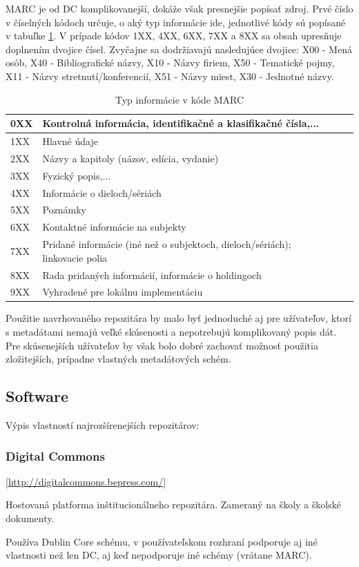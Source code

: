 \documentclass[thesis=M,slovak]{FITthesis}[2013/05/06]
\begin{document}
MARC je od DC komplikovanejší, dokáže však presnejšie popísať zdroj.
Prvé číslo v číselných kódoch určuje, o aký typ informácie ide, jednotlivé kódy sú popísané v tabuľke \ref{tab:marc}. V prípade kódov 1XX, 4XX, 6XX, 7XX a 8XX sa obsah upresňuje doplnením dvojice čísel. Zvyčajne sa dodržiavajú nasledujúce dvojice: X00 - Mená osôb, X40 - Bibliografické názvy, X10 - Názvy firiem, X50 - Tematické pojmy, X11 - Názvy stretnutí/konferencií, X51 - Názvy miest, X30 - Jednotné názvy.

\begin{table}\centering
 	\caption[MARC]{Typ informácie v kóde MARC}\label{tab:marc}
 	\begin{tabular}{|l|l|c|c|}\hline
0XX	& Kontrolná informácia, identifikačné a klasifikačné čísla,...\tabularnewline \hline
1XX	& Hlavné údaje \tabularnewline \hline
2XX	& Názvy a kapitoly (názov, edícia, vydanie) \tabularnewline \hline
3XX	& Fyzický popis,... \tabularnewline \hline
4XX	& Informácie o dieloch/sériách \tabularnewline \hline
5XX	& Poznámky \tabularnewline \hline
6XX	& Kontaktné informácie na subjekty \tabularnewline \hline
7XX	& Pridané informácie (iné než o subjektoch, dieloch/sériách); linkovacie polia \tabularnewline \hline
8XX	& Rada pridaných informácií, informácie o holdingoch \tabularnewline \hline
9XX	& Vyhradené pre lokálnu implementáciu \tabularnewline \hline
 	\end{tabular}
 \end{table}


Použitie navrhovaného repozitára by malo byť jednoduché aj pre užívateľov, ktorí s metadátami nemajú veľké skúsenosti a nepotrebujú komplikovaný popis dát. Pre skúsenejších užívateľov by však bolo dobré zachovať možnosť použitia zložitejších, prípadne vlastných metadátových schém.

\subsection{Software}

Výpis vlastností najrozšírenejších repozitárov:

\subsubsection {Digital Commons}  [\url{http://digitalcommons.bepress.com/}]

Hostovaná platforma inštitucionálneho repozitára. Zameraný na školy a školské dokumenty.

Používa Dublin Core schému, v používateľskom rozhraní podporuje aj iné vlastnosti než len DC, aj keď nepodporuje iné schémy (vrátane MARC).
\end{document}
